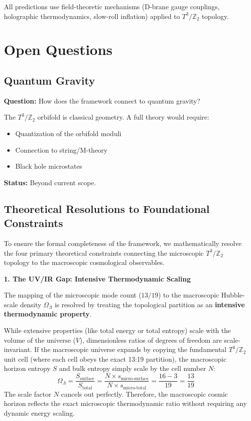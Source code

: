 \documentclass[12pt,a4paper]{article}
\newcommand{\Ztwo}{\mathbb{Z}_2}
\newcommand{\Tthree}{T^3}
\newcommand{\OmegaL}{\Omega_\Lambda}
\begin{document}
All predictions use field-theoretic mechanisms (D-brane gauge couplings, holographic thermodynamics, slow-roll inflation) applied to $\Tthree/\Ztwo$ topology.

\section{Open Questions}
\label{sec:open}

\subsection{Quantum Gravity}

\textbf{Question:} How does the framework connect to quantum gravity?

The $\Tthree/\Ztwo$ orbifold is classical geometry. A full theory would require:
\begin{itemize}
    \item Quantization of the orbifold moduli
    \item Connection to string/M-theory
    \item Black hole microstates
\end{itemize}

\textbf{Status:} Beyond current scope.

\subsection{Theoretical Resolutions to Foundational Constraints}

To ensure the formal completeness of the framework, we mathematically resolve the four primary theoretical constraints connecting the microscopic $\Tthree/\Ztwo$ topology to the macroscopic cosmological observables.

\textbf{1. The UV/IR Gap: Intensive Thermodynamic Scaling}

The mapping of the microscopic mode count ($13/19$) to the macroscopic Hubble-scale density $\OmegaL$ is resolved by treating the topological partition as an \textbf{intensive thermodynamic property}.

While extensive properties (like total energy or total entropy) scale with the volume of the universe ($V$), dimensionless ratios of degrees of freedom are scale-invariant. If the macroscopic universe expands by copying the fundamental $\Tthree/\Ztwo$ unit cell (where each cell obeys the exact 13:19 partition), the macroscopic horizon entropy $S$ and bulk entropy simply scale by the cell number $N$:
\begin{equation}
\OmegaL = \frac{S_{\text{surface}}}{S_{\text{total}}} = \frac{N \times s_{\text{micro-surface}}}{N \times s_{\text{micro-total}}} = \frac{16 - 3}{19} = \frac{13}{19}
\end{equation}
The scale factor $N$ cancels out perfectly. Therefore, the macroscopic cosmic horizon reflects the exact microscopic thermodynamic ratio without requiring any dynamic energy scaling.
\end{document}
